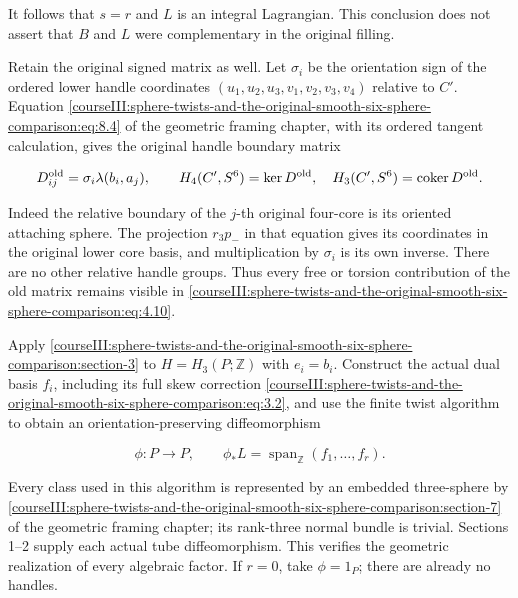 It follows that \(s=r\) and \(L\) is an integral Lagrangian. This conclusion does not assert that \(B\) and \(L\) were complementary in the original filling.

Retain the original signed matrix as well. Let \(\sigma_i\) be the orientation sign of the ordered lower handle coordinates \((u_1,u_2,u_3,v_1,v_2,v_3,v_4)\) relative to \(C'\). Equation \eqref{courseIII:sphere-twists-and-the-original-smooth-six-sphere-comparison:eq:8.4} of the geometric framing chapter, with its ordered tangent calculation, gives the original handle boundary matrix

\begin{equation}
D^{\rm old}_{ij}=\sigma_i\lambda(b_i,a_j),\qquad
 H_4(C',S^6)=\ker D^{\rm old},\quad
 H_3(C',S^6)=\operatorname{coker}D^{\rm old}.
 \label{courseIII:sphere-twists-and-the-original-smooth-six-sphere-comparison:eq:4.10}
\end{equation}

Indeed the relative boundary of the \(j\)-th original four-core is its oriented attaching sphere. The projection \(r_3p_-\) in that equation gives its coordinates in the original lower core basis, and multiplication by \(\sigma_i\) is its own inverse. There are no other relative handle groups. Thus every free or torsion contribution of the old matrix remains visible in \eqref{courseIII:sphere-twists-and-the-original-smooth-six-sphere-comparison:eq:4.10}.

Apply \cref{courseIII:sphere-twists-and-the-original-smooth-six-sphere-comparison:section-3} to \(H=H_3(P;\mathbb Z)\) with \(e_i=b_i\). Construct the actual dual basis \(f_i\), including its full skew correction \eqref{courseIII:sphere-twists-and-the-original-smooth-six-sphere-comparison:eq:3.2}, and use the finite twist algorithm to obtain an orientation-preserving diffeomorphism

\begin{equation}
\phi:P\longrightarrow P,\qquad
             \phi_*L=\operatorname{span}_{\mathbb Z}(f_1,\ldots,f_r).
 \label{courseIII:sphere-twists-and-the-original-smooth-six-sphere-comparison:eq:4.11}
\end{equation}

Every class used in this algorithm is represented by an embedded three-sphere by \cref{courseIII:sphere-twists-and-the-original-smooth-six-sphere-comparison:section-7} of the geometric framing chapter; its rank-three normal bundle is trivial. Sections 1--2 supply each actual tube diffeomorphism. This verifies the geometric realization of every algebraic factor. If \(r=0\), take \(\phi=1_P\); there are already no handles.

